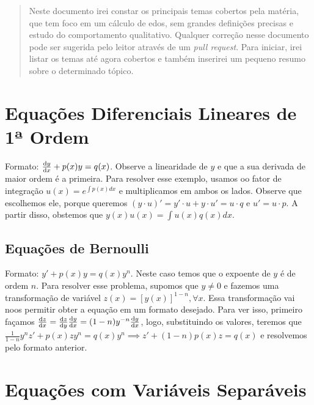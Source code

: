 \documentclass[12pt]{article}
\begin{document}
\maketitle

\begin{abstract}
    Neste documento irei constar os principais temas cobertos pela matéria,
    que tem foco em um cálculo de edos, sem grandes definições precisas e
    estudo do comportamento qualitativo. Qualquer correção nesse documento
    pode ser sugerida pelo leitor através de um \textit{pull request}. Para
    iniciar, irei listar os temas até agora cobertos e também inserirei um
    pequeno resumo sobre o determinado tópico.
\end{abstract}

\tableofcontents

\section{Equações Diferenciais Lineares de 1ª Ordem}

Formato: $\dv{y}{x} + p(x)y = q(x)$. Observe a linearidade de $y$ e que a sua
derivada de maior ordem é a primeira. Para resolver esse exemplo, usamos oo
fator de integração $u(x) = e^{\int p(x) dx}$ e multiplicamos em ambos os
lados. Observe que escolhemos ele, porque queremos $(y\cdot u)' = y'\cdot u +
y\cdot u' = u\cdot q$ e $u' = u\cdot p$. A partir disso, obstemos que
$y(x)u(x) = \int u(x)q(x) dx$. 

\subsection{Equações de Bernoulli}

Formato: $y' + p(x)y = q(x)y^n$. Neste caso temos que o expoente de $y$ é de
ordem $n$. Para resolver esse problema, supomos que $y \neq 0$ e fazemos uma
transformação de variável $z(x) = [y(x)]^{1-n}, \forall x$. Essa transformação
vai noos permitir obter a equação em um formato desejado. Para ver isso,
primeiro façamos $\dv{z}{x} = \dv{z}{y}\dv{y}{x} =
(1-n)y^{-n}\dv{y}{x}$, logo, substituindo os valores, teremos que
$\frac{1}{1-n}y^{n}z' + p(x)zy^n = q(x)y^n \implies z' + (1-n)p(x)z = q(x)$ e
resolvemos pelo formato anterior. 

\section{Equações com Variáveis Separáveis}
\end{document}
